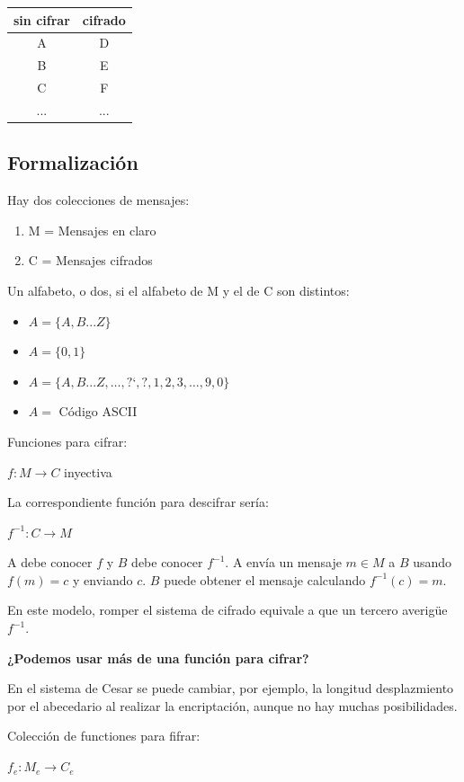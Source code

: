 			\begin{tabular}[h]{c|c}
			sin cifrar & cifrado \\ \hline
			A & D\\
			B & E\\
			C & F\\
			... & ...
			\end{tabular}

		\subsection{Formalización}

		Hay dos colecciones de mensajes:

		\begin{enumerate}
			\item M = Mensajes en claro
			\item C = Mensajes cifrados
		\end{enumerate}

		Un alfabeto, o dos, si el alfabeto de M y el de C son distintos:

		\begin{itemize}
			\item $A = \{A,B...Z\}$
			\item $A = \{0,1\}$
			\item $A = \{A,B...Z,\hdots,\text{?`},\text{?},1,2,3,\hdots,9,0\}$
			\item $A = $ Código ASCII 
		\end{itemize}



		Funciones para cifrar:

		$f: M \rightarrow C$ inyectiva

		La correspondiente función para descifrar sería:

		$f^{-1}: C \rightarrow M$


		A debe conocer $f$ y $B$ debe conocer $f^{-1}$. A envía un mensaje $m\in M$ a $B$ usando $f(m)=c$ y enviando $c$. $B$ puede obtener el mensaje calculando $f^{-1}(c) = m$.

		En este modelo, romper el sistema de cifrado equivale a que un tercero averigüe $f^{-1}$.


		\textbf{¿Podemos usar más de una función para cifrar?}

		En el sistema de Cesar se puede cambiar, por ejemplo, la longitud desplazmiento por el abecedario al realizar la encriptación, aunque no hay muchas posibilidades.


		\begin{defn}[Criptosistema]
			Colección de functiones para fifrar:

			$f_e : M_e \rightarrow C_e$

		\end{defn}


